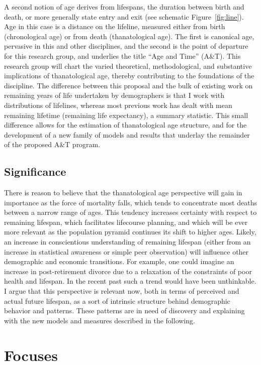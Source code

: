 \documentclass[a4paper,12pt]{article}
\begin{document}
A second notion of age derives from lifespans, the duration between birth and
death, or more generally state entry and exit (see schematic
Figure~\ref{fig:line}).
Age in this case is a distance on the lifeline, measured either from birth (chronological age) or from death
(thanatological age). The first is canonical age, pervasive in this and
other disciplines, and the second is the point of departure for this research
group, and underlies the title ``Age and Time'' (A\&T). This research group
will chart the varied theoretical, methodological, and substantive
implications of thanatological age, thereby contributing to the foundations of
the discipline. The difference between this proposal and the bulk of existing
work on remaining years of life undertaken by demographers
\cite{sanderson2010remeasuring,sanderson2005average,sanderson2007new} is that I
work with distributions of lifelines, whereas most previous work has dealt with
mean remaining lifetime (remaining life expectancy), a summary statistic. This
small difference allows for the estimation of thanatological age structure, and
for the development of a new family of models and results that underlay the
remainder of the proposed A\&T program.

\subsection{Significance}
There is reason to believe that the thanatological age perspective will gain
in importance as the force of mortality falls, which tends to concentrate
most deaths between a narrow range of ages. This tendency increases
certainty with respect to remaining lifespan, which facilitates lifecourse
planning, and which will be ever more relevant as the population pyramid
continues its shift to higher ages. Likely, an increase in conscientious
understanding of remaining lifespan (either from an increase in statistical
awareness or simple peer observation) will influence other demographic and
economic transitions. For example, one could imagine an increase in
post-retirement divorce due to a relaxation of the constraints of poor health
and lifespan. In the recent past such a trend would have been unthinkable.
I argue that this perspective is relevant now, both in terms of perceived and
actual future lifespan, as a sort of intrinsic structure behind demographic
behavior and patterns. These patterns are in need of discovery and explaining
with the new models and measures described in the following.

\section{Focuses}
\end{document}
